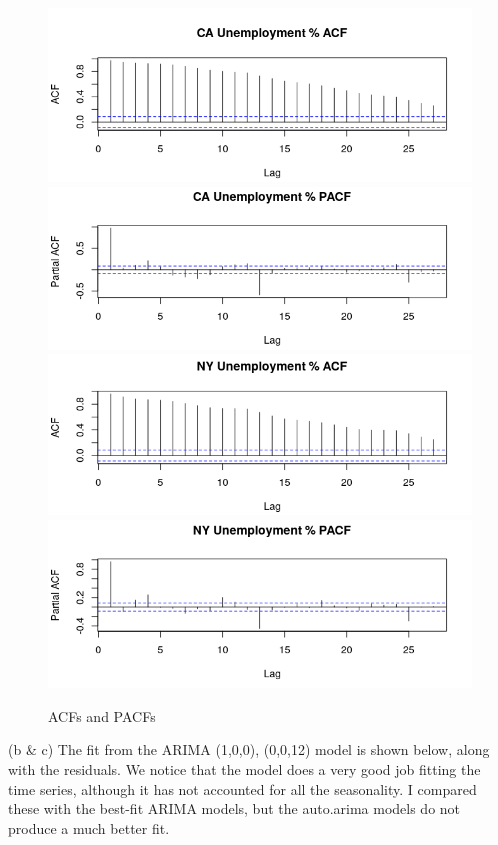 \documentclass{article}
\begin{document}
\begin{figure}[H]
	
	\includegraphics[width=\linewidth]{ca_acf}
	\includegraphics[width=\linewidth]{ca_pacf}
	\includegraphics[width=\linewidth]{ny_acf}
	\includegraphics[width=\linewidth]{ny_pacf}
	\caption{ACFs and PACFs} 
\end{figure}
 \noindent(b \& c) The fit from the ARIMA (1,0,0), (0,0,12) model is shown below, along with the residuals. We notice that the model does a very good job fitting the time series, although it has not accounted for all the seasonality. I compared these with the best-fit ARIMA models, but the auto.arima models do not produce a much better fit.
\end{document}

